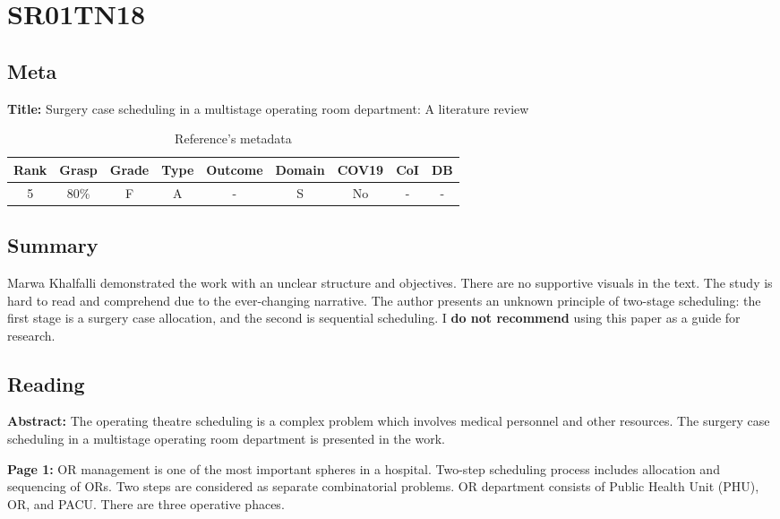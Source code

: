 \section{ SR01TN18 }


\subsection{Meta}

    \textbf{Title:}
    Surgery case scheduling in a multistage operating room department: A literature review

    \begin{table}[H]
        \centering
        \begin{tabular}{|c|c|c|c|c|c|c|c|c|}
            \hline
                \textbf{Rank} & \textbf{Grasp} & \textbf{Grade} & \textbf{Type} & \textbf{Outcome} & \textbf{Domain} & \textbf{COV19} & \textbf{CoI} & \textbf{DB} \\
            \hline
                5 & 80\% & F & A & - & S & No & - & - \\
            \hline
        \end{tabular}
        \caption{Reference's metadata}
        \label{tab:SR01TN18}
    \end{table}

\subsection{Summary}
    Marwa Khalfalli demonstrated the work with an unclear structure and objectives. There are no supportive visuals in the text. The study is hard to read and comprehend due to the ever-changing narrative. The author presents an unknown principle of two-stage scheduling: the first stage is a surgery case allocation, and the second is sequential scheduling. I \textbf{do not recommend} using this paper as a guide for research.

\subsection{Reading}
    \textbf{Abstract:}
    The operating theatre scheduling is a complex problem which involves medical personnel and other resources. The surgery case scheduling in a multistage operating room department is presented in the work.

    \textbf{Page 1:}
    OR management is one of the most important spheres in a hospital. Two-step scheduling process includes allocation and sequencing of ORs. Two steps are considered as separate combinatorial problems. OR department consists of Public Health Unit (PHU), OR, and PACU. There are three operative phaces. 
    
